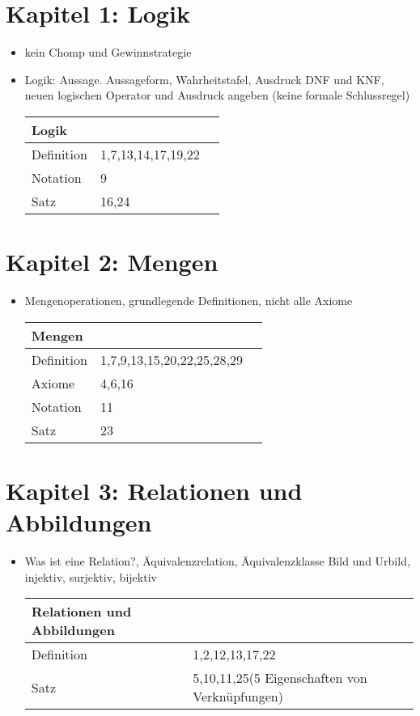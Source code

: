\documentclass[11pt,a4paper]{article}
\begin{document}
\section*{Kapitel 1: Logik}
\begin{itemize}
	\item kein Chomp und Gewinnstrategie
	\item Logik: Aussage. Aussageform, Wahrheitstafel, Ausdruck DNF und KNF, neuen logischen Operator und Ausdruck angeben (keine formale Schlussregel)
	\begin{center}
		\begin{tabular}{ | l | l | l | }
			\hline
			Logik& \\ \hline	\hline	
			Definition&1,7,13,14,17,19,22 \\ \hline
			Notation&9 \\ \hline
			Satz&16,24\\
			\hline	
		\end{tabular}
	\end{center}
\end{itemize}
	
\section*{Kapitel 2: Mengen}
\begin{itemize}
	\item Mengenoperationen, grundlegende Definitionen, nicht alle Axiome
	\begin{center}
		\begin{tabular}{ | l | l | l | }
			\hline
			Mengen& \\ \hline	\hline	
			Definition&1,7,9,13,15,20,22,25,28,29 \\ \hline
			Axiome&4,6,16 \\ \hline
			Notation&11 \\ \hline
			Satz&23\\ 
			\hline	
		\end{tabular}
	\end{center}	
\end{itemize}

\section*{Kapitel 3: Relationen und Abbildungen}
\begin{itemize}
	\item Was ist eine Relation?, Äquivalenzrelation, Äquivalenzklasse Bild und Urbild, injektiv, surjektiv, bijektiv
	\begin{center}
		\begin{tabular}{ | l | l | l | }
			\hline
			Relationen und Abbildungen& \\ \hline	\hline	
			Definition&1,2,12,13,17,22 \\ \hline
			Satz&5,10,11,25(5 Eigenschaften von Verknüpfungen)\\ 
			\hline	
		\end{tabular}
	\end{center}	
\end{itemize}
\end{document}
